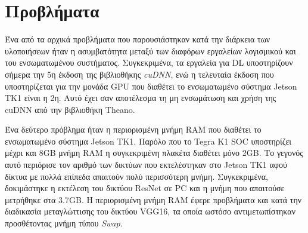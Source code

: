 
\section{Προβλήματα}

Ένα από τα αρχικά προβλήματα που παρουσιάστηκαν κατά την διάρκεια των υλοποιήσεων
ήταν η ασυμβατότητα μεταξύ των διαφόρων εργαλείων λογισμικού και του
ενσωματωμένου συστήματος. Συγκεκριμένα, τα εργαλεία για DL υποστηρίζουν σήμερα την 5η έκδοση της βιβλιοθήκης
\emph{cuDNN}, ενώ η τελευταία έκδοση που υποστηρίζεται για την μονάδα GPU που διαθέτει
το ενσωματωμένο σύστημα Jetson TK1 είναι η 2η. Αυτό έχει σαν αποτέλεσμα
τη μη ενσωμάτωση και χρήση της cuDNN από την βιβλιοθήκη Theano.

Ένα δεύτερο πρόβλημα ήταν η περιορισμένη μνήμη RAM που διαθέτει το
ενσωματωμένο σύστημα Jetson TK1. Παρόλο που το Tegra K1 SOC υποστηρίζει
μέχρι και 8GB μνήμη RAM η συγκεκριμένη πλακέτα διαθέτει μόνο 2GB.
Το γεγονός αυτό περιόρισε τον αριθμό των δικτύων που εκτελέστηκαν στο Jetson TK1
αφού δίκτυα με πολλά επίπεδα απαιτούν πολύ περισσότερη μνήμη. Συγκεκριμένα,
δοκιμάστηκε η εκτέλεση του δικτύου
ResNet σε PC και η μνήμη που απαιτούσε μετρήθηκε στα 3.7GB.
Η περιορισμένη μνήμη RAM έφερε προβλήματα και κατά την διαδικασία μεταγλώττισης
του δικτύου VGG16, τα οποία ωστόσο αντιμετωπίστηκαν προσθέτοντας μνήμη τύπου \emph{Swap}.
